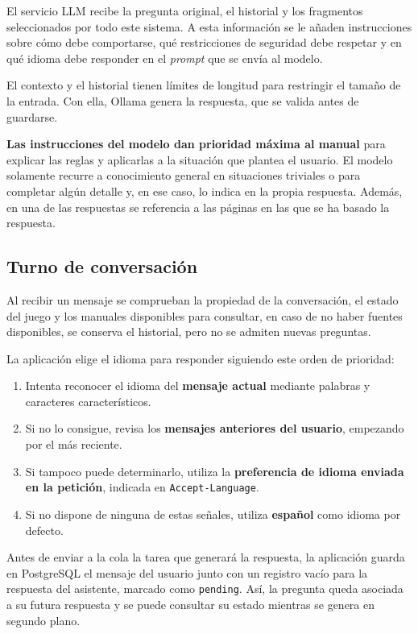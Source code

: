 El servicio \ac{LLM} recibe la pregunta original, el historial y los
fragmentos seleccionados por todo este sistema. A esta información se le añaden instrucciones sobre cómo debe comportarse,
qué restricciones de seguridad debe respetar y en qué idioma debe responder en el \textit{prompt} que se envía
al modelo.

El contexto
y el historial tienen límites de longitud para restringir el tamaño de la
entrada. Con ella, Ollama genera la respuesta, que se valida antes de guardarse.

\textbf{Las instrucciones del modelo dan prioridad máxima
al manual} para explicar las reglas
y aplicarlas a la situación que plantea el usuario. El
modelo solamente recurre a
conocimiento general en situaciones triviales o para completar algún detalle y, en ese caso, lo indica en la propia
respuesta. Además, en una de las respuestas se referencia
a las páginas en las que se ha basado la respuesta.

\FloatBarrier
\subsection{Turno de conversación}

Al recibir un mensaje se comprueban la propiedad de la conversación, el
estado del juego y los manuales disponibles para consultar, en caso de no haber fuentes disponibles, se conserva el historial, pero no se admiten nuevas preguntas.

La aplicación elige el idioma  para responder siguiendo este orden de
prioridad:

\begin{enumerate}
    \item Intenta reconocer el idioma del \textbf{mensaje actual} mediante
    palabras y caracteres característicos.
    \item Si no lo consigue, revisa los \textbf{mensajes anteriores del
    usuario}, empezando por el más reciente.
    \item Si tampoco puede determinarlo, utiliza la \textbf{preferencia de
    idioma enviada en la petición}, indicada en \texttt{Accept-Language}.
    \item Si no dispone de ninguna de estas señales, utiliza
    \textbf{español} como idioma por defecto.
\end{enumerate}

Antes de enviar a la cola la tarea que generará la respuesta, la aplicación
guarda en PostgreSQL el mensaje del usuario junto con un registro vacío
para la respuesta del asistente, marcado como \texttt{pending}. Así, la
pregunta queda asociada a su futura respuesta y se puede consultar su
estado mientras se genera en segundo plano.

